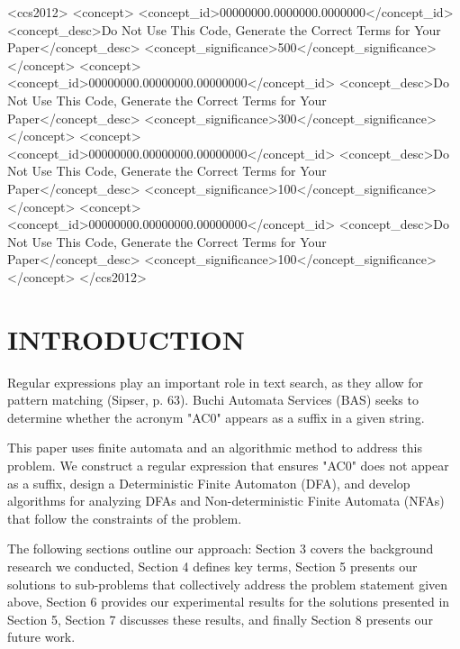 \documentclass[sigconf,anonymous,review]{acmart}
\begin{document}
\begin{CCSXML}
<ccs2012>
 <concept>
  <concept_id>00000000.0000000.0000000</concept_id>
  <concept_desc>Do Not Use This Code, Generate the Correct Terms for Your Paper</concept_desc>
  <concept_significance>500</concept_significance>
 </concept>
 <concept>
  <concept_id>00000000.00000000.00000000</concept_id>
  <concept_desc>Do Not Use This Code, Generate the Correct Terms for Your Paper</concept_desc>
  <concept_significance>300</concept_significance>
 </concept>
 <concept>
  <concept_id>00000000.00000000.00000000</concept_id>
  <concept_desc>Do Not Use This Code, Generate the Correct Terms for Your Paper</concept_desc>
  <concept_significance>100</concept_significance>
 </concept>
 <concept>
  <concept_id>00000000.00000000.00000000</concept_id>
  <concept_desc>Do Not Use This Code, Generate the Correct Terms for Your Paper</concept_desc>
  <concept_significance>100</concept_significance>
 </concept>
</ccs2012>
\end{CCSXML}


\maketitle

\section{INTRODUCTION}
Regular expressions play an important role in text search, as they allow for pattern matching (Sipser, p. 63). Buchi Automata Services (BAS) seeks to determine whether the acronym "AC0" appears as a suffix in a given string.

This paper uses finite automata and an algorithmic method to address this problem. We construct a regular expression that ensures "AC0" does not appear as a suffix, design a Deterministic Finite Automaton (DFA), and develop algorithms for analyzing DFAs and Non-deterministic Finite Automata (NFAs) that follow the constraints of the problem.

The following sections outline our approach: Section 3 covers the background research we conducted, Section 4 defines key terms, Section 5 presents our solutions to sub-problems that collectively address the problem statement given above, Section 6 provides our experimental results for the solutions presented in Section 5, Section 7 discusses these results, and finally Section 8 presents our future work.
\end{document}
